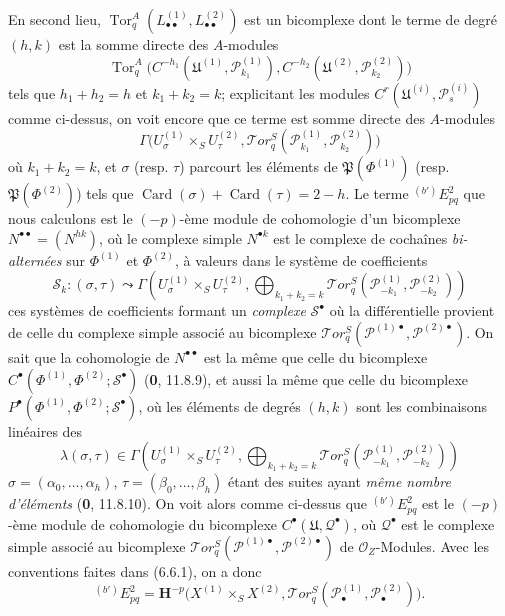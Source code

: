 \begin{env}[6.6.4]
En second lieu,
$\operatorname{Tor}_q^A(L_{\bullet\bullet}^{(1)},L_{\bullet\bullet}^{(2)})$ est un
bicomplexe dont le terme de degré $(h,k)$ est la somme directe des $A$-modules
\[
  \operatorname{Tor}_q^A
  \bigl(C^{-h_1}(\mathfrak U^{(1)},\mathscr P_{k_1}^{(1)}),
        C^{-h_2}(\mathfrak U^{(2)},\mathscr P_{k_2}^{(2)})\bigr)
\]
tels que $h_1+h_2=h$ et $k_1+k_2=k$; explicitant les modules
$C^r(\mathfrak U^{(i)},\mathscr P_s^{(i)})$ comme ci-dessus, on voit encore
que ce terme est somme directe des $A$-modules
\[
  \Gamma\bigl(U_\sigma^{(1)}\times_S U_\tau^{(2)},
    \mathscr{T}\!or_q^S
    (\mathscr P_{k_1}^{(1)},\mathscr P_{k_2}^{(2)})\bigr)
\]
où $k_1+k_2=k$, et $\sigma$ (resp. $\tau$) parcourt les éléments de
$\mathfrak P(\Phi^{(1)})$ (resp. $\mathfrak P(\Phi^{(2)})$) tels que
$\operatorname{Card}(\sigma)+\operatorname{Card}(\tau)=2-h$. Le terme
${}^{(b')}E_{pq}^2$ que nous calculons est le $(-p)$-ème module de
cohomologie d'un bicomplexe $N^{\bullet\bullet}=(N^{hk})$, où le complexe
simple $N^{\bullet k}$ est le complexe de cochaînes \emph{bi-alternées} sur
$\Phi^{(1)}$ et $\Phi^{(2)}$, à valeurs dans le système de coefficients
\[
  \mathscr S_k:(\sigma,\tau)\leadsto
  \Gamma\left(U_\sigma^{(1)}\times_S U_\tau^{(2)},
    \bigoplus_{k_1+k_2=k}
    \mathscr{T}\!or_q^S
    (\mathscr P_{-k_1}^{(1)},\mathscr P_{-k_2}^{(2)})\right)
\]
ces systèmes de coefficients formant un \emph{complexe} $\mathscr S^\bullet$ où la
différentielle provient de celle du complexe simple associé au bicomplexe
$\mathscr{T}\!or_q^S
(\mathscr P^{(1)\bullet},\mathscr P^{(2)\bullet})$. On sait que la
cohomologie de $N^{\bullet\bullet}$ est la même que celle du bicomplexe
$C^\bullet(\Phi^{(1)},\Phi^{(2)};\mathscr S^\bullet)$
(\textbf{0}, 11.8.9), et aussi la même que celle du bicomplexe
$P^\bullet(\Phi^{(1)},\Phi^{(2)};\mathscr S^\bullet)$, où les éléments de
degrés $(h,k)$ sont les combinaisons linéaires des
\[
  \lambda(\sigma,\tau)\in
  \Gamma\left(U_\sigma^{(1)}\times_S U_\tau^{(2)},
    \bigoplus_{k_1+k_2=k}
    \mathscr{T}\!or_q^S
    (\mathscr P_{-k_1}^{(1)},\mathscr P_{-k_2}^{(2)})\right)
\]
$\sigma=(\alpha_0,\ldots,\alpha_h)$,
$\tau=(\beta_0,\ldots,\beta_h)$ étant des suites ayant \emph{même nombre
d'éléments} (\textbf{0}, 11.8.10). On voit alors comme ci-dessus que
${}^{(b')}E_{pq}^2$ est le $(-p)$-ème module de cohomologie du
bicomplexe $C^\bullet(\mathfrak U,\mathscr Q^\bullet)$, où
$\mathscr Q^\bullet$ est le complexe simple associé au bicomplexe
$\mathscr{T}\!or_q^S
(\mathscr P^{(1)\bullet},\mathscr P^{(2)\bullet})$ de
$\mathscr O_Z$-Modules. Avec les conventions faites dans (6.6.1), on a donc
\[
  {}^{(b')}E_{pq}^2
  =\mathbf H^{-p}\bigl(X^{(1)}\times_S X^{(2)},
    \mathscr{T}\!or_q^S
    (\mathscr P_\bullet^{(1)},\mathscr P_\bullet^{(2)})\bigr).
\]
\end{env}

